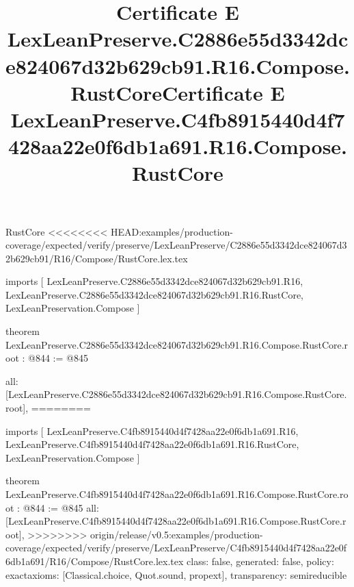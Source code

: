 \begin{lexlean}{RustCore}
<<<<<<<< HEAD:examples/production-coverage/expected/verify/preserve/LexLeanPreserve/C2886e55d3342dce824067d32b629cb91/R16/Compose/RustCore.lex.tex
\title{Certificate E LexLeanPreserve.C2886e55d3342dce824067d32b629cb91.R16.Compose.RustCore}
\begin{coremodule}
imports [
  LexLeanPreserve.C2886e55d3342dce824067d32b629cb91.R16,
  LexLeanPreserve.C2886e55d3342dce824067d32b629cb91.R16.RustCore,
  LexLeanPreservation.Compose
]

theorem LexLeanPreserve.C2886e55d3342dce824067d32b629cb91.R16.Compose.RustCore.root : @844 := @845 {
  all: [LexLeanPreserve.C2886e55d3342dce824067d32b629cb91.R16.Compose.RustCore.root],
========
\title{Certificate E LexLeanPreserve.C4fb8915440d4f7428aa22e0f6db1a691.R16.Compose.RustCore}
\begin{coremodule}
imports [
  LexLeanPreserve.C4fb8915440d4f7428aa22e0f6db1a691.R16,
  LexLeanPreserve.C4fb8915440d4f7428aa22e0f6db1a691.R16.RustCore,
  LexLeanPreservation.Compose
]

theorem LexLeanPreserve.C4fb8915440d4f7428aa22e0f6db1a691.R16.Compose.RustCore.root : @844 := @845 {
  all: [LexLeanPreserve.C4fb8915440d4f7428aa22e0f6db1a691.R16.Compose.RustCore.root],
>>>>>>>> origin/release/v0.5:examples/production-coverage/expected/verify/preserve/LexLeanPreserve/C4fb8915440d4f7428aa22e0f6db1a691/R16/Compose/RustCore.lex.tex
  class: false,
  generated: false,
  policy: exact{axioms: [Classical.choice, Quot.sound, propext]},
  transparency: semireducible
}


\end{coremodule}}
\end{coremodule}
\end{lexlean}
